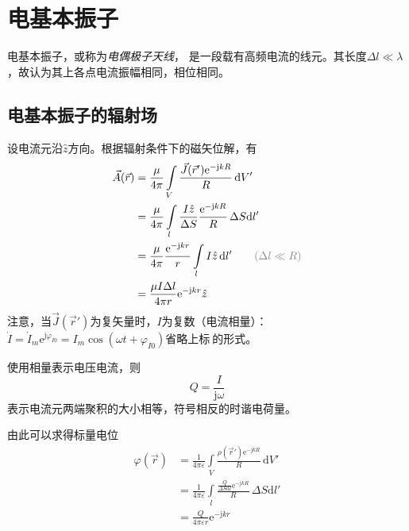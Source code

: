 \section{电基本振子}

        电基本振子，或称为\emph{电偶极子天线}， 是一段载有高频电流的线元。其长度$\Delta  l\ll \lambda$，故认为其上各点电流振幅相同，相位相同。

    \subsection{电基本振子的辐射场}
        设电流元沿$\hat{z}$方向。根据辐射条件下的磁矢位解，有
        \begin{equation}
            \begin{aligned}
                \vec{A}(\vec{r})&=\frac{\mu}{4\pi}\int\limits_{V}\frac{\vec{J}(\vec{r}')\mathrm{e}^{-\mathrm{j}kR}}{R}\,\mathrm{d}V'\\
                &=\frac{\mu}{4\pi}\int\limits_{l}\frac{I\hat{z}}{\Delta S}\frac{\mathrm{e}^{-\mathrm{j}kR}}{R}\,\Delta S\mathrm{d}l'\\
                &=\frac{\mu}{4\pi}\frac{\mathrm{e}^{-\mathrm{j}kr}}{r}\int\limits_{l}I\hat{z}\,\mathrm{d}l'\qquad\mbox{\color{gray}$(\Delta l\ll R)$}\\
                &=\frac{\mu I \Delta l}{4\pi r}\mathrm{e}^{-\mathrm{j}kr}\hat{z}
            \end{aligned}
        \end{equation}
        注意，当$\vec{J}(\vec{r}')$为复矢量时，$I$为复数（电流相量）：$\dot{I}=\dot{I}_m \mathrm{e}^{\mathrm{j}\varphi_{I0}}=I_m\cos(\omega t+\varphi_{I0})$省略上标$\dot{~}$的形式。

        使用相量表示电压电流，则
        \begin{equation}
            Q=\frac{I}{\mathrm{j}\omega}
        \end{equation}
        表示电流元两端聚积的大小相等，符号相反的时谐电荷量。

        {\color{gray} 由此可以求得标量电位
        \begin{equation}
            \begin{aligned}
                \varphi(\vec{r})
                &=\frac{1}{4\pi \varepsilon}\int\limits_{V}\frac{\rho(\vec{r}')\mathrm{e}^{-\mathrm{j}kR}}{R}\,\mathrm{d}V'\\
                &=\frac{1}{4\pi \varepsilon}\int\limits_{l}\frac{\frac{Q}{\Delta S \mathrm{d}l}\mathrm{e}^{-\mathrm{j}kR}}{R}\, \Delta S\mathrm{d}l'\\
                &=\frac{Q}{4\pi \varepsilon r}\mathrm{e}^{-\mathrm{j}kr}
            \end{aligned}
        \end{equation}
        }

